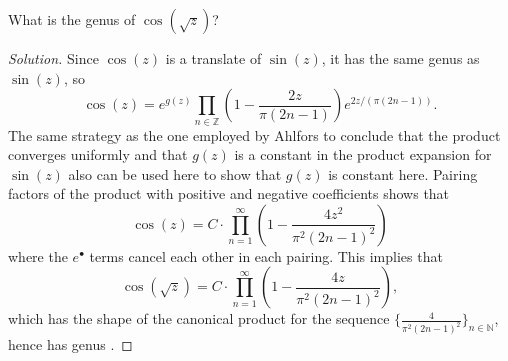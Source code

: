 \documentclass[10pt]{article}
\providecommand{\NN}{\mathbb N}
\providecommand{\ZZ}{\mathbb Z}
\newenvironment{soln}{\begin{proof}[Solution]}{\end{proof}}
\providecommand{\paren}[1]{\left(#1\right)}
\begin{document}
\begin{problem}
    [p.198\#3]
    What is the genus of $\cos(\sqrt z)$?
\end{problem}

\begin{soln}
    Since $\cos(z)$ is a translate of $\sin(z)$,
    it has the same genus as $\sin(z)$, so
    \begin{equation*}
	\cos(z) = e^{g(z)}
	\prod_{n\in\ZZ}\paren{1 - \frac{2z}{\pi(2n-1)}}e^{2z/(\pi(2n-1))}.
    \end{equation*}
    The same strategy as the one employed by Ahlfors
    to conclude that the product converges uniformly
    and that $g(z)$ is a constant in the product expansion for
    $\sin(z)$ also can be used here to show that $g(z)$ is constant here.
    Pairing factors of the product with positive and negative coefficients
    shows that
    \begin{equation*}
	\cos(z) = C\cdot\prod_{n=1}^\infty
	\paren{1 - \frac{4z^2}{\pi^2(2n-1)^2}}
    \end{equation*}
    where the $e^\bullet$ terms cancel each other in each pairing.
    This implies that
    \begin{equation*}
	\cos(\sqrt z) = C\cdot \prod_{n=1}^\infty
	\paren{1 - \frac{4z}{\pi^2(2n-1)^2}},
    \end{equation*}
    which has the shape of the canonical product for the sequence
    $\{\frac 4{\pi^2(2n-1)^2}\}_{n\in\NN}$, hence has genus .
\end{soln}
\end{document}
